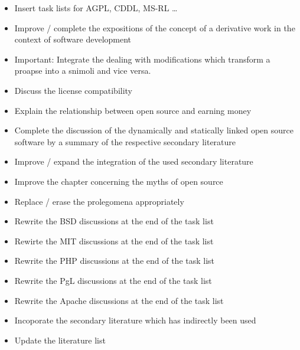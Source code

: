 \begin{footnotesize}
\begin{itemize}
  \item Insert task lists for AGPL, CDDL, MS-RL \ldots
  \item Improve / complete the expositions of the concept of a derivative work
  in the context of software development
  \item Important: Integrate the dealing with modifications which transform
  a proapse into a snimoli and vice versa.
  \item Discuss the license compatibility
  \item Explain the relationship between open source and earning money
  \item Complete the discussion of the dynamically and statically linked open
  source software by a summary of the respective secondary literature
  \item Improve / expand the integration of the used secondary literature
  \item Improve the chapter concerning the myths of open source
  \item Replace / erase the prolegomena appropriately
  \item Rewrite the BSD discussions at the end of the task list 
  \item Rewirte the MIT discussions at the end of the task list
  \item Rewrite the PHP discussions at the end of the task list
  \item Rewrite the PgL discussions at the end of the task list
  \item Rewrite the Apache discussions at the end of the task list
  \item Incoporate the secondary literature which has indirectly been used
  \item Update the literature list
\end{itemize}
\end{footnotesize}

%

